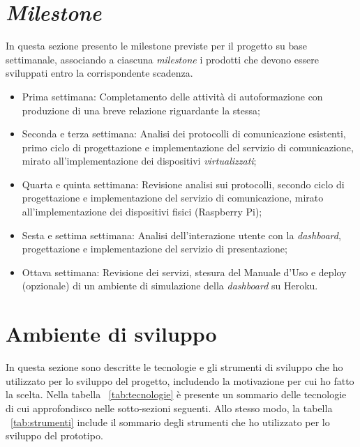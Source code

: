 \clearpage
\section*{\emph{Milestone}}
In questa sezione presento le \gls{milestone} previste per il progetto su base settimanale, associando a ciascuna \emph{milestone} i prodotti che devono essere sviluppati entro la corrispondente scadenza.
\begin{itemize}
	\item Prima settimana: Completamento delle attività di autoformazione con produzione di una breve relazione riguardante la stessa;
	\item Seconda e terza settimana: Analisi dei protocolli di comunicazione esistenti, primo ciclo di progettazione e implementazione del servizio di comunicazione, mirato all'implementazione dei dispositivi \textit{virtualizzati};
	\item Quarta e quinta settimana: Revisione analisi sui protocolli, secondo ciclo di progettazione e implementazione del servizio di comunicazione, mirato all'implementazione dei dispositivi fisici (Raspberry Pi);
	\item Sesta e settima settimana: Analisi dell'interazione utente con la \emph{dashboard}, progettazione e implementazione del servizio di presentazione;
	\item Ottava settimana: Revisione dei servizi, stesura del Manuale d'Uso e deploy (opzionale) di un ambiente di simulazione della \emph{dashboard} su Heroku.
\end{itemize}

\section{Ambiente di sviluppo}

In questa sezione sono descritte le tecnologie e gli strumenti di sviluppo che ho utilizzato per lo sviluppo del progetto, includendo la motivazione per cui ho fatto la scelta.
Nella tabella ~\ref{tab:tecnologie} è presente un sommario delle tecnologie di cui approfondisco nelle sotto-sezioni seguenti. Allo stesso modo, la tabella ~\ref{tab:strumenti} include il sommario degli strumenti che ho utilizzato per lo sviluppo del prototipo.

